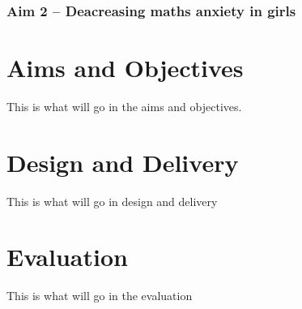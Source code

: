 \documentclass[11pt, a4paper, notitlepage]{article}
\begin{document}
\subsubsection{Aim 2 -- Deacreasing maths anxiety in girls}

\section{Aims and Objectives}
This is what will go in the aims and objectives. 

\section{Design and Delivery}

This is what will go in design and delivery

\section{Evaluation}
This is what will go in the evaluation



\end{document}

